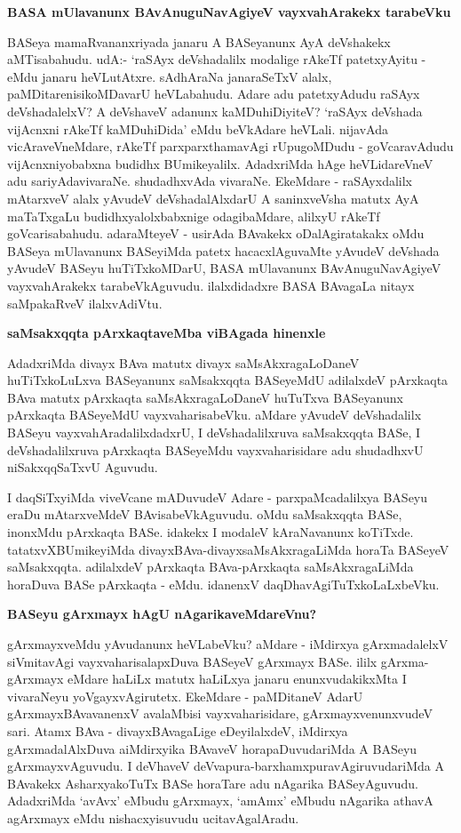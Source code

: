 {\bigskip
\noindent
{\large\bf BASA mUlavanunx BAvAnuguNavAgiyeV vayxvahArakekx tarabeVku}}\label{page10a}
\medskip

\noindent
BASeya mamaRvananxriyada janaru A BASeyanunx AyA deVshakekx aMTisabahudu. udA:- `raSAyx deVshadalilx modalige rAkeTf patetxyAyitu - eMdu janaru heVLu\-tAtxre. sAdhAraNa janaraSeTxV alalx, paMDitarenisikoMDavarU heVLabahudu. Adare adu patetxyAdudu raSAyx deVshadalelxV? A \-deVshaveV adanunx kaMDuhiDiyiteV? `raSAyx deVshada vijAcnxni rAkeTf kaMDuhiDida' eMdu beVkAdare heVLali. nija\-vAda vicAra\-veVneMdare, rAkeTf parxparxthamavAgi rUpugoMDudu - goVcaravAdudu vijAcnxni\-yobabxna budidhx BUmikeyalilx. AdadxriMda hAge heVLidareVneV adu sariyAda\break viva\-raNe. shudadhxvAda vivaraNe. EkeMdare - raSAyxdalilx mAtarxveV alalx yAvudeV deVsha\-dalAlxdarU A saninxveVsha matutx AyA maTaTx\-gaLu budidhxyalolxbabxnige odagibaMdare, alilxyU rAkeTf goVcarisabahudu. adaraMteyeV - usi\-rAda BAvakekx oDalAgi\-ratakakx oMdu BASeya mUlavanunx BASeyiMda patetx hacacxlAguvaMte yAvudeV deVshada\- yAvudeV BASeyu huTiTxkoMDarU, BASA mUlavanunx BAvAnuguNa\-vAgiyeV vayxvahArakekx tarabeVkAguvudu. ilalxdidadxre BASA BAvagaLa nitayx saMpa\-kaRveV ilalxvAdiVtu.

{\bigskip
\noindent
{\large\bf saMsakxqqta pArxkaqtaveMba viBAgada hinenxle}}\label{page11}
\medskip

\noindent
AdadxriMda divayx BAva matutx divayx saMsAkxragaLoDaneV huTiTxkoLuLxva BASeyanunx saMsakxqqta BASe\-yeMdU adilalxdeV pArxkaqta BAva matutx pArxkaqta saMsAkxragaLoDaneV huTuTxva BASeyanunx pArxkaqta BASe\-yeMdU vayxvaharisabeVku. aMdare yAvudeV deVshadalilx BASeyu vayxvahAradalilxdadxrU, I deVshadalilxruva saMsakxqqta BASe, I deVshadalilxruva pArxkaqta BASeyeMdu vayxvaharisidare adu shudadhxvU niSakxqqSaTxvU Agu\-vudu.

I daqSiTxyiMda viveVcane mADuvudeV Adare - parxpaMcadalilxya BASeyu eraDu mAtarxveMdeV BAvisabeVkAguvudu. oMdu saMsakxqqta BASe, inonxMdu pArxkaqta BASe. idakekx I modaleV kAraNa\-vanunx koTiTxde. tatatxvXBUmikeyiMda divayxBAva-divayxsaMsAkxragaLiMda horaTa BASeyeV saMsakxqqta. adi\-lalxdeV pArxkaqta BAva-pArxkaqta saMsAkxragaLiMda horaDuva BASe pArxkaqta - eMdu. idanenxV daqDhavAgiTuTx\-koLaLxbeVku.

{\bigskip
\noindent
{\large\bf BASeyu gArxmayx hAgU nAgarikaveMdareVnu?}}\label{page11a}
\medskip

\noindent
gArxmayxveMdu yAvudanunx heVLabeVku? aMdare - iMdirxya gArxmadalelxV siVmitavAgi vayxvaharisa\-lapxDuva BASeyeV gArxmayx BASe. ililx gArxma-gArxmayx eMdare haLiLx matutx haLiLxya janaru enunxvudakikxMta I vivaraNeyu yoVgayxvAgirutetx. EkeMdare - paMDitaneV AdarU gArxmayxBAvavanenxV avalaMbisi vayxva\-harisi\-dare, gArxmayxvenunxvudeV sari. Atamx BAva - divayxBAvagaLige eDeyilalxdeV, iMdirxya gArxmadalAlxDuva aiMdirxyika BAvaveV horapaDuvudariMda A BASeyu gArxmayxvAguvudu. I deVhaveV deVvapura-barxhamx\-pura\-vAgiruvudariMda A BAvakekx AsharxyakoTuTx BASe horaTare adu nAgarika BASeyAguvudu. Adadx\-riMda `avAvx' eMbudu gArxmayx, `amAmx' eMbudu nAgarika athavA agArxmayx eMdu nishacxyisuvudu ucitavAgalAradu. 

